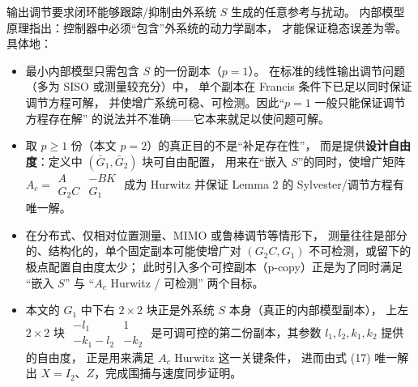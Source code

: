 输出调节要求闭环能够跟踪/抑制由外系统 $S$ 生成的任意参考与扰动。
内部模型原理指出：控制器中必须“包含”外系统的动力学副本，
才能保证稳态误差为零。具体地：
\begin{itemize}
  \item 最小内部模型只需包含 $S$ 的一份副本（$p=1$）。
    在标准的线性输出调节问题（多为 SISO 或测量较充分）中，
    单个副本在 Francis 条件下已足以同时保证调节方程可解，
    并使增广系统可稳、可检测。因此“$p=1$ 一般只能保证调节方程存在解”
    的说法并不准确——它本来就足以使问题可解。
  \item 取 $p\ge 1$ 份（本文 $p=2$）的真正目的不是“补足存在性”，
    而是提供\textbf{设计自由度}：定义中 $(\bar G_1,\bar G_2)$ 块可自由配置，
    用来在“嵌入 $S$”的同时，使增广矩阵
    $A_c=\begin{smallmatrix}A&-BK\\G_2C&G_1\end{smallmatrix}$ 成为 Hurwitz
    并保证 Lemma 2 的 Sylvester/调节方程有唯一解。
  \item 在分布式、仅相对位置测量、MIMO 或鲁棒调节等情形下，
    测量往往是部分的、结构化的，单个固定副本可能使增广对
    $(G_2C,G_1)$ 不可检测，或留下的极点配置自由度太少；
    此时引入多个可控副本（p-copy）正是为了同时满足
    “嵌入 $S$” 与 “$A_c$ Hurwitz / 可检测” 两个目标。
  \item 本文的 $G_1$ 中下右 $2\times 2$ 块正是外系统 $S$ 本身（真正的内部模型副本），
    上左 $2\times 2$ 块 $\begin{smallmatrix}-l_1&1\\-k_1-l_2&-k_2\end{smallmatrix}$
    是可调可控的第二份副本，其参数 $l_1,l_2,k_1,k_2$ 提供的自由度，
    正是用来满足 $A_c$ Hurwitz 这一关键条件，
    进而由式 (17) 唯一解出 $X=I_2$、$Z$，完成围捕与速度同步证明。
\end{itemize}